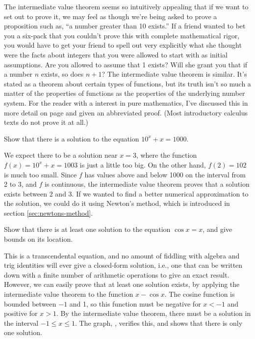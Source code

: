 The intermediate value theorem seems so intuitively appealing that if we want to
set out to prove it, we may feel as though we're being asked to prove a proposition such as, ``a number greater than 10 exists.''
If a friend wanted to bet you a six-pack that you couldn't prove this with complete mathematical rigor, you would have to
get your friend to spell out very explicitly what she thought were the facts about
integers that you were allowed to start with as initial assumptions. Are you allowed to assume that 1 exists?
Will she grant you that if a number $n$ exists, so does $n+1$?
The intermediate value theorem is similar. It's stated as a theorem about certain types
of functions, but its truth isn't so much a matter of the properties of functions as
the properties of the underlying number system. For the reader with a interest in pure
mathematics, I've discussed this in more detail on page \pageref{detour:intermediate-value} and given
an abbreviated proof.\label{intermediate-value-ref-to-detour}
(Most introductory calculus texts do not prove it at all.)

\begin{eg}
\egquestion Show that there is a solution to the equation $10^x+x=1000$.

\eganswer We expect there to be a solution near $x=3$, where the function $f(x)=10^x+x=1003$ is just a little too big.
On the other hand, $f(2)=102$ is much too small. Since $f$ has values above and below 1000 on the interval from
2 to 3, and $f$ is continuous, the intermediate value theorem proves that a solution exists between 2 and 3.
If we wanted to find a better numerical approximation to the solution, we could do it using Newton's
method, which is introduced in section \ref{sec:newtons-method}.
\end{eg}

\begin{eg}\label{eg:x-minus-cos-x}
\egquestion Show that there is at least one solution to the equation $\cos x=x$, and give bounds on its location.

\eganswer This is a transcendental equation, and no amount of fiddling with algebra and trig identities will
ever give a closed-form solution, i.e., one that can be written down with a finite number of arithmetic
operations to give an exact result. However, we can easily prove that at least one solution exists, by
applying the intermediate value theorem to the function $x-\cos x$. The cosine function is bounded between
$-1$ and 1, so this function must be negative for $x<-1$ and positive for $x>1$. By the intermediate value
theorem, there must be a solution in the interval $-1 \le x \le 1$. The graph, , verifies
this, and shows that there is only one solution.
\end{eg}


